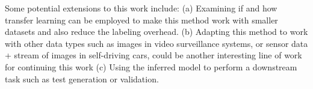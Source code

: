 Some potential extensions to this work include:
(a) Examining if and how transfer learning can be employed to make this method work with smaller datasets and also reduce the labeling overhead. 
(b) Adapting this method to work with other data types such as images in video surveillance systems, or sensor data + stream of images in self-driving cars, could be another interesting line of work for continuing this work
(c) Using the inferred model to perform a downstream task such as test generation or validation. 
